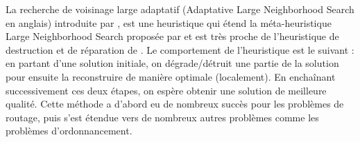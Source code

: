 \begin{mydef}
\label{def:ALNS}
La recherche de voisinage large adaptatif (Adaptative Large Neighborhood Search en anglais) introduite par \cite{Ropke2005}, est une heuristique qui étend la méta-heuristique Large Neighborhood Search proposée par \cite{shaw1998using} et est très proche de l'heuristique de destruction et de réparation de \cite{schrimpf2000record}. Le comportement de l'heuristique est le suivant : en partant d'une solution initiale, on dégrade/détruit une partie de la solution pour ensuite la reconstruire de manière optimale (localement). En enchaînant successivement ces deux étapes, on espère obtenir une solution de meilleure qualité. Cette méthode a d'abord eu de nombreux succès pour les problèmes de routage, puis s'est étendue vers de nombreux autres problèmes comme les problèmes d'ordonnancement.
\end{mydef}
